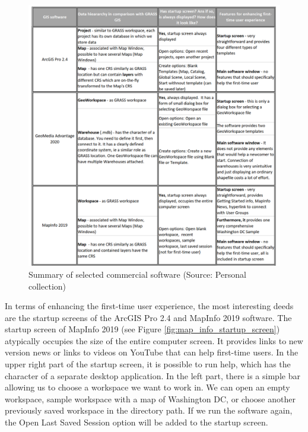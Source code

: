 \documentclass[a4paper,10pt,twoside]{article}
\begin{document}
\vspace{0.3cm}
\begin{figure}[hbt!] 
\begin{center}
\includegraphics[width=16.5cm]{../pictures/commercial_software.png}
\caption[Summary of selected commercial software]{Summary of selected commercial software (Source: Personal collection)}
\label{fig:commercial_software}
\end{center}
\end{figure}

\noindent In terms of enhancing the first-time user experience, the most interesting deeds are the startup screens of the ArcGIS Pro 2.4 and MapInfo 2019 software. The startup screen of MapInfo 2019 (see Figure \ref{fig:map_info_startup_screen}) atypically occupies the size of the entire computer screen. It provides links to new version news or links to videos on YouTube that can help first-time users. In the upper right part of the startup screen, it is possible to run help, which has the character of a separate desktop application. In the left part, there is a simple bar allowing us to choose a workspace we want to work in. We can open an empty workspace, sample workspace with a map of Washington DC, or choose another previously saved workspace in the directory path. If we run the software again, the Open Last Saved Session option will be added to the startup screen.
\end{document}
